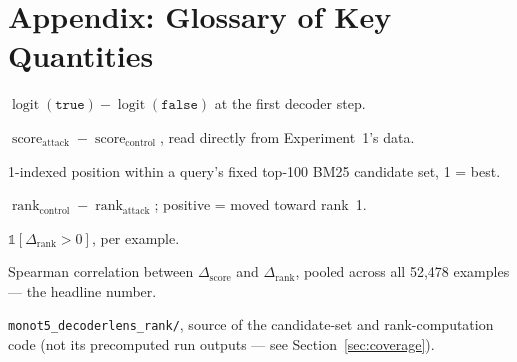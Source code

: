 \documentclass[11pt]{article}
\newcommand{\score}{\operatorname{score}}
\newcommand{\rank}{\operatorname{rank}}
\begin{document}
\section*{Appendix: Glossary of Key Quantities}

\begin{description}[leftmargin=1.6em,style=nextline]
  \item[$\score$] $\operatorname{logit}(\texttt{true})-\operatorname{logit}(\texttt{false})$ at the first decoder step.
  \item[$\Delta_{\score}$] $\score_{\text{attack}}-\score_{\text{control}}$, read directly from Experiment~1's data.
  \item[$\rank$] 1-indexed position within a query's fixed top-100 BM25 candidate set, 1 = best.
  \item[$\Delta_{\rank}$] $\rank_{\text{control}} - \rank_{\text{attack}}$; positive = moved toward rank~1.
  \item[success] $\mathbb{1}[\Delta_{\rank}>0]$, per example.
  \item[$\rho_{\text{global}}$] Spearman correlation between $\Delta_{\score}$ and $\Delta_{\rank}$, pooled across all 52{,}478 examples --- the headline number.
  \item[Experiment 8 / DecoderLens] \texttt{monot5\_decoderlens\_rank/}, source of the candidate-set and rank-computation code (not its precomputed run outputs --- see Section~\ref{sec:coverage}).
\end{description}
\end{document}
